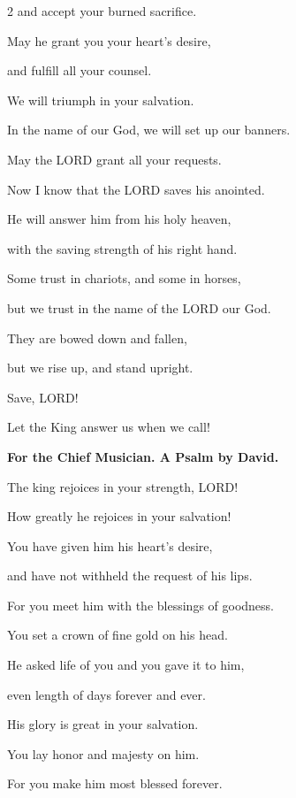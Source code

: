 \begin{multicols}{2}
	and accept your burned sacrifice.
	
	\vspace{\baselineskip}
	
	\myverse{}May he grant you your heart’s desire,
	
	and fulfill all your counsel.
	
	
	\myverse{}We will triumph in your salvation.
	
	In the name of our God, we will set up our banners.
	
	May the LORD grant all your requests.
	
	
	\myverse{}Now I know that the LORD saves his anointed.
	
	He will answer him from his holy heaven,
	
	with the saving strength of his right hand.
	
	
	\myverse{}Some trust in chariots, and some in horses,
	
	but we trust in the name of the LORD our God.
	
	
	\myverse{}They are bowed down and fallen,
	
	but we rise up, and stand upright.
	
	
	\myverse{}Save, LORD!
	
	Let the King answer us when we call!
	
	
	\mychapter{}\textbf{For the Chief Musician. A Psalm by David.}
	
	\quad \myverse*{}The king rejoices in your strength, LORD!
	
	How greatly he rejoices in your salvation!
	
	
	\myverse{}You have given him his heart’s desire,
	
	and have not withheld the request of his lips.
	
	\vspace{\baselineskip}
	
	\myverse{}For you meet him with the blessings of goodness.
	
	You set a crown of fine gold on his head.
	
	
	\myverse{}He asked life of you and you gave it to him,
	
	even length of days forever and ever.
	
	
	\myverse{}His glory is great in your salvation.
	
	You lay honor and majesty on him.
	
	
	\myverse{}For you make him most blessed forever.
	

\end{multicols}
